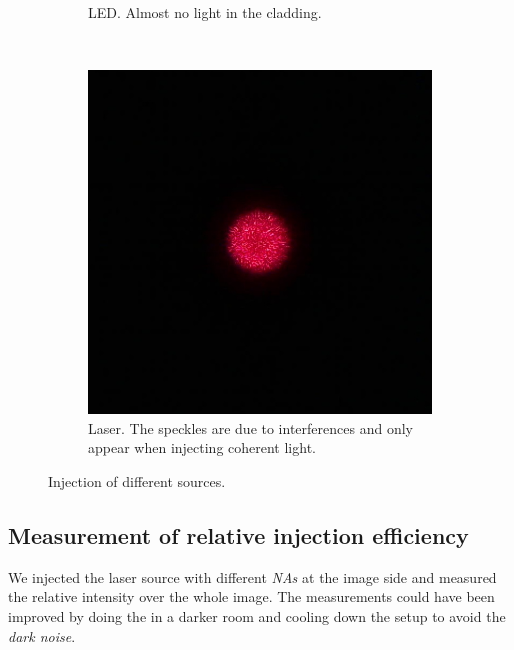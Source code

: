 \documentclass[a4paper, 12pt]{paper}
\begin{document}
\begin{figure}[H]
\begin{subfigure}[t]{0.30\textwidth}
        \caption{LED. Almost no light in the cladding.}
    \end{subfigure}
    ~
    \begin{subfigure}[t]{0.30\textwidth}
        \includegraphics[width=\textwidth]{img/laser-injection.jpg}
        \caption{Laser. The speckles are due to interferences and only appear when injecting coherent light.}
    \end{subfigure}
    \caption{Injection of different sources.}
\label{fig:sources_injection}
\end{figure}


\subsection{Measurement of relative injection efficiency}

We injected the laser source with different \emph{NAs} at the image side and measured the relative intensity over the whole image.
The measurements could have been improved by doing the in a darker room and cooling down the setup to avoid the \emph{dark noise}.
\end{document}
